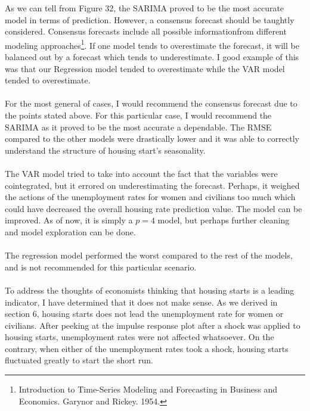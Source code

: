 \documentclass[11pt]{article}
\begin{document}
As we can tell from Figure 32, the SARIMA proved to be the most accurate model in terms of prediction. However, a consensus forecast should be taughtly considered. Consensus forecasts include all possible informationfrom different modeling approaches\footnote{Introduction to Time-Series Modeling and Forecasting in Business and Economics. Garynor and Rickey. 1954.}. If one model tends to overestimate the forecast, it will be balanced out by a forecast which tends to underestimate. I good example of this was that our Regression model tended to overestimate while the VAR model tended to overestimate.
\\\\
For the most general of cases, I would recommend the consensus forecast due to the points stated above. For this particular case, I would recommend the SARIMA as it proved to be the most accurate a dependable. The RMSE compared to the other models were drastically lower and it was able to correctly understand the structure of housing start's seasonality.
\\\\
The VAR model tried to take into account the fact that the variables were cointegrated, but it errored on underestimating the forecast. Perhaps, it weighed the actions of the unemployment rates for women and civilians too much which could have decreased the overall housing rate prediction value. The model can be improved. As of now, it is simply a $p=4$ model, but perhaps further cleaning and model exploration can be done.
\\\\
The regression model performed the worst compared to the rest of the models, and is not recommended for this particular scenario.
\\\\
To address the thoughts of economists thinking that housing starts is a leading indicator, I have determined that it does not make sense. As we derived in section 6, housing starts does not lead the unemployment rate for women or civilians. After peeking at the impulse response plot after a shock was applied to housing starts, unemployment rates were not affected whatsoever. On the contrary, when either of the unemployment rates took a shock, housing starts fluctuated greatly to start the short run.
\end{document}
